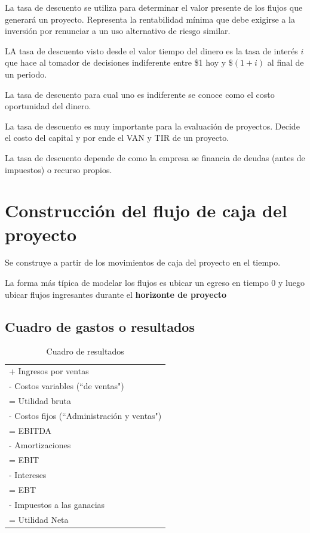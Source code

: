 \documentclass[twocolumn,10pt]{article}
\begin{document}
La tasa de descuento se utiliza para determinar el valor presente de los flujos que generará un proyecto. Representa la rentabilidad mínima que debe exigirse a la inversión por renunciar a un uso alternativo de riesgo similar.

LA tasa de descuento visto desde el valor tiempo del dinero es la tasa de interés $i$ que hace al tomador de decisiones indiferente entre \$1 hoy y $\$(1+i)$ al final de un periodo.

La tasa de descuento para cual uno es indiferente se conoce como el costo oportunidad del dinero.

La tasa de descuento es muy importante para la evaluación de proyectos. Decide el costo del capital y por ende el VAN y TIR de un proyecto.

La tasa de descuento depende de como la empresa se financia de deudas (antes de impuestos) o recurso propios.


\section{Construcción del flujo de caja del proyecto}

Se construye a partir de los movimientos de caja del proyecto en el tiempo.

La forma más típica de modelar los flujos es ubicar un egreso en tiempo 0 y luego ubicar flujos ingresantes durante el \textbf{horizonte de proyecto}


\subsection{Cuadro de gastos o resultados}

\begin{table}[h]
	\centering
	\begin{tabular}{|l|} \hline
		+ Ingresos por ventas \\
		- Costos variables (``de ventas") \\ \hline
		= Utilidad bruta \\
		- Costos fijos (``Administración y ventas") \\ \hline
		= EBITDA \\
		- Amortizaciones \\ \hline
		= EBIT \\
		- Intereses \\ \hline
		= EBT \\
		- Impuestos a las ganacias
		\\ \hline
		= Utilidad Neta\\ \hline
	\end{tabular}
\caption{Cuadro de resultados}
\end{table}
\end{document}
